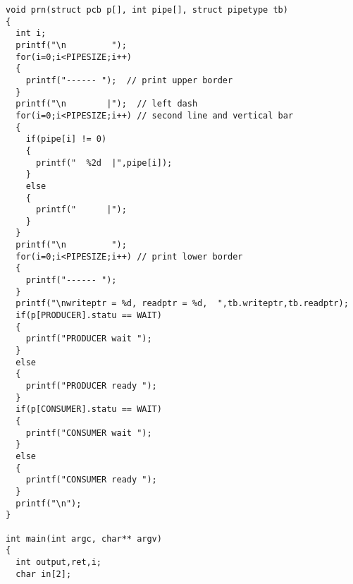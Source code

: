 \documentclass[11pt]{article}
\begin{document}
\begin{lstlisting}[caption = {代码清单}, label = {lst: code}]
void prn(struct pcb p[], int pipe[], struct pipetype tb)
{
  int i;
  printf("\n         ");
  for(i=0;i<PIPESIZE;i++)
  {
    printf("------ ");  // print upper border
  }
  printf("\n        |");  // left dash
  for(i=0;i<PIPESIZE;i++) // second line and vertical bar
  {
    if(pipe[i] != 0)
    {
      printf("  %2d  |",pipe[i]);
    }
    else
    {
      printf("      |");
    }
  }
  printf("\n         ");
  for(i=0;i<PIPESIZE;i++) // print lower border
  {
    printf("------ ");
  }
  printf("\nwriteptr = %d, readptr = %d,  ",tb.writeptr,tb.readptr);
  if(p[PRODUCER].statu == WAIT)
  {
    printf("PRODUCER wait ");
  }
  else
  {
    printf("PRODUCER ready ");
  }
  if(p[CONSUMER].statu == WAIT)
  {
    printf("CONSUMER wait ");
  }
  else
  {
    printf("CONSUMER ready ");
  }
  printf("\n");
}

int main(int argc, char** argv)
{
  int output,ret,i;
  char in[2];


\end{lstlisting}
\end{document}
